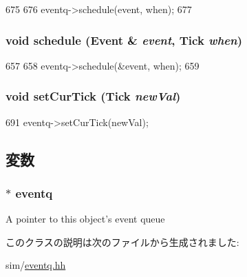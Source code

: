 \begin{DoxyCode}
675     {
676         eventq->schedule(event, when);
677     }
\end{DoxyCode}
\hypertarget{classEventManager_a4ddebbfe9a12b95be6fb993ce892dcd3}{
\subsubsection[{schedule}]{\setlength{\rightskip}{0pt plus 5cm}void schedule ({\bf Event} \& {\em event}, \/  {\bf Tick} {\em when})}}
\label{classEventManager_a4ddebbfe9a12b95be6fb993ce892dcd3}



\begin{DoxyCode}
657     {
658         eventq->schedule(&event, when);
659     }
\end{DoxyCode}
\hypertarget{classEventManager_abc2f41fbb4828612a2637268ab8ce640}{
\subsubsection[{setCurTick}]{\setlength{\rightskip}{0pt plus 5cm}void setCurTick ({\bf Tick} {\em newVal})}}
\label{classEventManager_abc2f41fbb4828612a2637268ab8ce640}



\begin{DoxyCode}
691 { eventq->setCurTick(newVal); }
\end{DoxyCode}


\subsection{変数}
\hypertarget{classEventManager_acfd644007a0f188b7f221e67a6b453aa}{
\subsubsection[{eventq}]{$\ast$ {\bf eventq}}}
\label{classEventManager_acfd644007a0f188b7f221e67a6b453aa}
A pointer to this object's event queue 

このクラスの説明は次のファイルから生成されました:\begin{DoxyCompactItemize}
\item 
sim/\hyperlink{eventq_8hh}{eventq.hh}\end{DoxyCompactItemize}
